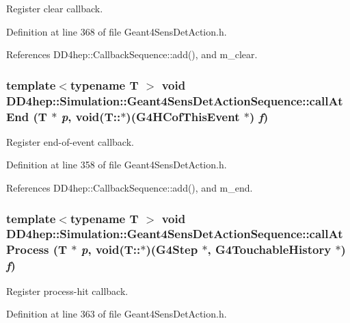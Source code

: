 Register clear callback. 

Definition at line 368 of file Geant4SensDetAction.h.

References DD4hep::CallbackSequence::add(), and m\_\-clear.\hypertarget{class_d_d4hep_1_1_simulation_1_1_geant4_sens_det_action_sequence_ade99ad7b09ea4aca99de6af0ecba4149}{
\subsubsection[{callAtEnd}]{\setlength{\rightskip}{0pt plus 5cm}template$<$typename T $>$ void DD4hep::Simulation::Geant4SensDetActionSequence::callAtEnd ({\bf T} $\ast$ {\em p}, \/  void(T::$\ast$)(G4HCofThisEvent $\ast$) {\em f})}}
\label{class_d_d4hep_1_1_simulation_1_1_geant4_sens_det_action_sequence_ade99ad7b09ea4aca99de6af0ecba4149}


Register end-\/of-\/event callback. 

Definition at line 358 of file Geant4SensDetAction.h.

References DD4hep::CallbackSequence::add(), and m\_\-end.\hypertarget{class_d_d4hep_1_1_simulation_1_1_geant4_sens_det_action_sequence_a89a1ba859a0048eeab83244e9d4bc9b3}{
\subsubsection[{callAtProcess}]{\setlength{\rightskip}{0pt plus 5cm}template$<$typename T $>$ void DD4hep::Simulation::Geant4SensDetActionSequence::callAtProcess ({\bf T} $\ast$ {\em p}, \/  void(T::$\ast$)(G4Step $\ast$, G4TouchableHistory $\ast$) {\em f})}}
\label{class_d_d4hep_1_1_simulation_1_1_geant4_sens_det_action_sequence_a89a1ba859a0048eeab83244e9d4bc9b3}


Register process-\/hit callback. 

Definition at line 363 of file Geant4SensDetAction.h.

